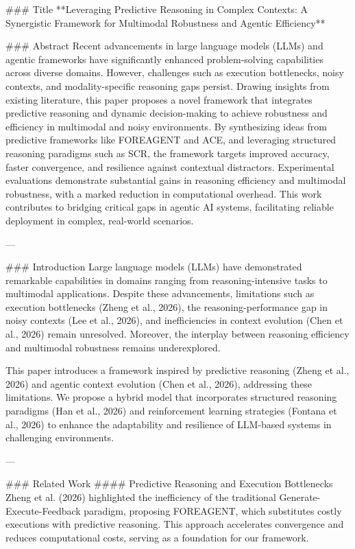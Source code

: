 ### Title
**Leveraging Predictive Reasoning in Complex Contexts: A Synergistic Framework for Multimodal Robustness and Agentic Efficiency**

### Abstract
Recent advancements in large language models (LLMs) and agentic frameworks have significantly enhanced problem-solving capabilities across diverse domains. However, challenges such as execution bottlenecks, noisy contexts, and modality-specific reasoning gaps persist. Drawing insights from existing literature, this paper proposes a novel framework that integrates predictive reasoning and dynamic decision-making to achieve robustness and efficiency in multimodal and noisy environments. By synthesizing ideas from predictive frameworks like FOREAGENT and ACE, and leveraging structured reasoning paradigms such as SCR, the framework targets improved accuracy, faster convergence, and resilience against contextual distractors. Experimental evaluations demonstrate substantial gains in reasoning efficiency and multimodal robustness, with a marked reduction in computational overhead. This work contributes to bridging critical gaps in agentic AI systems, facilitating reliable deployment in complex, real-world scenarios.

---

### Introduction
Large language models (LLMs) have demonstrated remarkable capabilities in domains ranging from reasoning-intensive tasks to multimodal applications. Despite these advancements, limitations such as execution bottlenecks (Zheng et al., 2026), the reasoning-performance gap in noisy contexts (Lee et al., 2026), and inefficiencies in context evolution (Chen et al., 2026) remain unresolved. Moreover, the interplay between reasoning efficiency and multimodal robustness remains underexplored.

This paper introduces a framework inspired by predictive reasoning (Zheng et al., 2026) and agentic context evolution (Chen et al., 2026), addressing these limitations. We propose a hybrid model that incorporates structured reasoning paradigms (Han et al., 2026) and reinforcement learning strategies (Fontana et al., 2026) to enhance the adaptability and resilience of LLM-based systems in challenging environments.

---

### Related Work
#### Predictive Reasoning and Execution Bottlenecks
Zheng et al. (2026) highlighted the inefficiency of the traditional Generate-Execute-Feedback paradigm, proposing FOREAGENT, which substitutes costly executions with predictive reasoning. This approach accelerates convergence and reduces computational costs, serving as a foundation for our framework.

